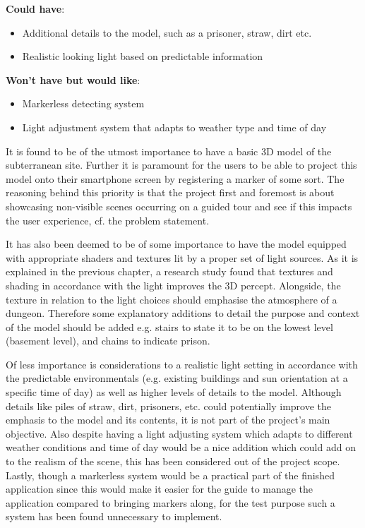 \textbf{Could have}:
\begin{itemize}
\item Additional details to the model, such as a prisoner, straw, dirt etc.
\item Realistic looking light based on predictable information
\end{itemize}

\textbf{Won’t have but would like}:
\begin{itemize}
\item Markerless detecting system
\item Light adjustment system that adapts to weather type and time of day
\end{itemize}

It is found to be of the utmost importance to have a basic 3D model of the subterranean site. Further it is paramount for the users to be able to project this model onto their smartphone screen by registering a marker of some sort. The reasoning behind this priority is that the project first and foremost is about showcasing non-visible scenes occurring on a guided tour and see if this impacts the user experience, cf. the problem statement. 

It has also been deemed to be of some importance to have the model equipped with appropriate shaders and textures lit by a proper set of light sources. As it is explained in the previous chapter, a research study found that textures and shading in accordance with the light improves the 3D percept. Alongside, the texture in relation to the light choices should emphasise the atmosphere of a dungeon. Therefore some explanatory additions to detail the purpose and context of the model should be added e.g. stairs to state it to be on the lowest level (basement level), and chains to indicate prison. 

Of less importance is considerations to a realistic light setting in accordance with the predictable environmentals (e.g. existing buildings and sun orientation at a specific time of day) as well as higher levels of details to the model. Although details like piles of straw, dirt, prisoners, etc. could potentially improve the emphasis to the model and its contents, it is not part of the project’s main objective. Also despite having a light adjusting system which adapts to different weather conditions and time of day would be a nice addition which could add on to the realism of the scene, this has been considered out of the project scope. Lastly, though a markerless system would be a practical part of the finished application since this would make it easier for the guide to manage the application compared to bringing markers along, for the test purpose such a system has been found unnecessary to implement.


